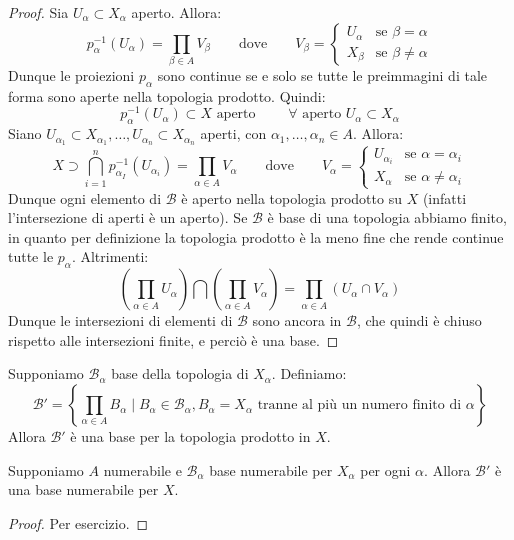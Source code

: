 \documentclass{article}
\begin{document}
\begin{proof}
	Sia $U_\alpha \subset X_\alpha$ aperto. Allora:
	$$p_\alpha ^{-1} (U_\alpha)=\prod_{\beta \in A} V_\beta \qquad \text{dove}\qquad V_\beta =\begin{cases}U_\alpha & \text{se }\beta =			\alpha \\ X_\beta & \text{se } \beta \ne \alpha \end{cases}$$
	Dunque le proiezioni $p_\alpha$ sono continue se e solo se tutte le preimmagini di tale forma sono aperte nella topologia prodotto. 				Quindi:
	$$p_\alpha ^{-1} (U_\alpha) \subset X \text{ aperto } \qquad \forall \text{ aperto } U_\alpha \subset X_\alpha$$
	Siano $U_{\alpha _1} \subset X_{\alpha _1} , \dots , U_{\alpha _n} \subset X_{\alpha _n}$ aperti, con $\alpha _1, \dots, \alpha _n \in A$. 			Allora:
	$$X \supset \bigcap _{i=1}^n p_{\alpha _I}^{-1}(U_{\alpha _i}) = \prod _{\alpha \in A} V_\alpha \qquad \text{dove}\qquad V_\alpha =					\begin{cases}U_{\alpha _i} & \text{se }\alpha =\alpha  _i \\ X_\alpha & \text{se } \alpha \ne \alpha _i \end{cases}$$
	Dunque ogni elemento di $\mathcal{B}$ è aperto nella topologia prodotto su $X$ (infatti l'intersezione di aperti è un aperto). Se $					\mathcal{B}$ è base di una topologia abbiamo finito, in quanto per definizione la topologia prodotto è la meno fine che rende continue 			tutte le $p_\alpha$. Altrimenti:
	$$\left( \prod_{\alpha \in A} U_\alpha \right) \bigcap \left( \prod_{\alpha \in A} V_\alpha \right)=\prod _{\alpha \in A} (U_\alpha \cap V_				\alpha)$$
	Dunque le intersezioni di elementi di $\mathcal{B}$ sono ancora in $\mathcal{B}$, che quindi è chiuso rispetto alle intersezioni finite, e 		perciò è una base.
\end{proof}
\begin{oss}
	Supponiamo $\mathcal{B}_\alpha$ base della topologia di $X_\alpha$. Definiamo:
	$$\mathcal{B}'=\left \{ \prod_{\alpha \in A} B_\alpha \mid B_\alpha \in \mathcal{B}_\alpha, B_\alpha =X_\alpha \text{ tranne al più un 				numero finito di } \alpha \right \}$$
	Allora $\mathcal{B}'$ è una base per la topologia prodotto in $X$.
\end{oss}
\begin{cor}
	Supponiamo $A$ numerabile e $\mathcal{B}_\alpha$ base numerabile per $X_\alpha$ per ogni $\alpha$. Allora $\mathcal{B}'$ è una 			base numerabile per $X$.
\end{cor}
\begin{proof}
	Per esercizio.
\end{proof}
\end{document}
